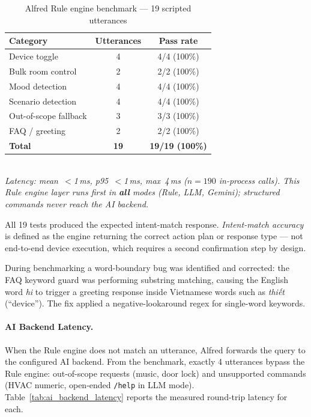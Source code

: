 \begin{table}[H]
\centering
\caption[Alfred Rule engine benchmark]{Alfred Rule engine benchmark --- 19 scripted utterances}
\label{tab:rule_benchmark}
\small
\begin{tabular}{@{} l c c @{}}
\toprule
\textbf{Category} & \textbf{Utterances} & \textbf{Pass rate} \\
\midrule
Device toggle     & 4  & 4/4 (100\%)  \\
Bulk room control & 2  & 2/2 (100\%)  \\
Mood detection    & 4  & 4/4 (100\%)  \\
Scenario detection& 4  & 4/4 (100\%)  \\
Out-of-scope fallback & 3 & 3/3 (100\%) \\
FAQ / greeting    & 2  & 2/2 (100\%)  \\
\midrule
\textbf{Total}    & \textbf{19} & \textbf{19/19 (100\%)} \\
\bottomrule
\end{tabular}
\footnotesize\\\textit{Latency: mean~$<$1\,ms, p95~$<$1\,ms, max~4\,ms ($n=190$ in-process calls).
This Rule engine layer runs first in \textbf{all} modes (Rule, LLM, Gemini); structured commands never reach the AI backend.}
\end{table}

All 19 tests produced the expected intent-match response. \textit{Intent-match accuracy} is defined as the engine returning the correct action plan or response type — not end-to-end device execution, which requires a second confirmation step by design.

During benchmarking a word-boundary bug was identified and corrected: the FAQ keyword guard was performing substring matching, causing the English word \textit{hi} to trigger a greeting response inside Vietnamese words such as \textit{thiết} (``device''). The fix applied a negative-lookaround regex for single-word keywords.

\paragraph{AI Backend Latency.}

When the Rule engine does not match an utterance, Alfred forwards the query to the configured AI backend. From the benchmark, exactly 4 utterances bypass the Rule engine: out-of-scope requests (music, door lock) and unsupported commands (HVAC numeric, open-ended \texttt{/help} in LLM mode). Table~\ref{tab:ai_backend_latency} reports the measured round-trip latency for each.

